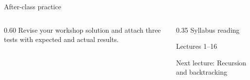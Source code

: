 \documentclass[10pt,aspectratio=169]{beamer}
\begin{document}
\begin{frame}[fragile,t]{After-class practice}
\begin{columns}[T,onlytextwidth]\begin{column}{0.60\textwidth}
Revise your workshop solution and attach three tests with expected and actual results.
\end{column}\begin{column}{0.35\textwidth}\small
Syllabus reading\par Lectures 1--16

Next lecture: Recursion and backtracking
\end{column}\end{columns}
\end{frame}
\end{document}

